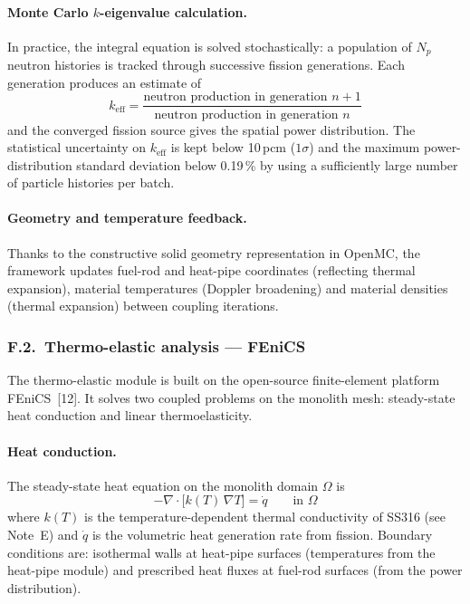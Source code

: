 \documentclass[11pt,a4paper]{article}
\newcommand{\keff}{\ensuremath{k_{\mathrm{eff}}}}
\begin{document}
\paragraph{Monte Carlo $k$-eigenvalue calculation.}
In practice, the integral equation is solved stochastically: a
population of $N_p$ neutron histories is tracked through successive
fission generations. Each generation produces an estimate of
\begin{equation}
k_{\mathrm{eff}}
= \frac{\text{neutron production in generation } n+1}
       {\text{neutron production in generation } n}
\end{equation}
and the converged fission source gives the spatial power distribution.
The statistical uncertainty on \keff{} is kept below 10\,pcm
($1\sigma$) and the maximum power-distribution standard deviation below
0.19\,\% by using a sufficiently large number of particle histories per
batch.

\paragraph{Geometry and temperature feedback.}
Thanks to the constructive solid geometry representation in OpenMC, the
framework updates fuel-rod and heat-pipe coordinates (reflecting
thermal expansion), material temperatures (Doppler broadening) and
material densities (thermal expansion) between coupling iterations.


\subsubsection*{F.2.~Thermo-elastic analysis --- FEniCS}

The thermo-elastic module is built on the open-source finite-element
platform FEniCS~[12]. It solves two coupled problems on the monolith
mesh: steady-state heat conduction and linear thermoelasticity.

\paragraph{Heat conduction.}
The steady-state heat equation on the monolith domain $\Omega$ is
\begin{equation}
-\nabla\cdot\bigl[k(T)\,\nabla T\bigr] = \dot{q}
\qquad \text{in } \Omega
\label{eq:heat}
\end{equation}
where $k(T)$ is the temperature-dependent thermal conductivity of
SS316 (see Note~E) and $\dot{q}$ is the volumetric heat generation
rate from fission. Boundary conditions are: isothermal walls at heat-pipe
surfaces (temperatures from the heat-pipe module) and prescribed heat
fluxes at fuel-rod surfaces (from the power distribution).
\end{document}
